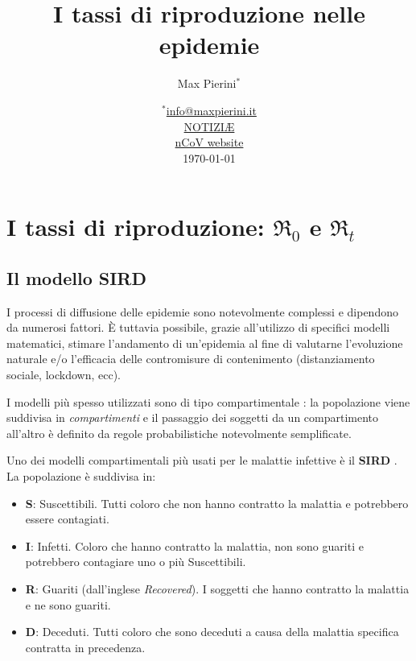 \documentclass[11pt]{article}
\title{I tassi di riproduzione nelle epidemie}
\author{Max Pierini$^*$}
\date{%
    $^*$\href{mailto:info@maxpierini.it}{info@maxpierini.it}\\%
    \href{https://t.me/notiziae}{NOTIZI\AE}\\%
    \href{https://maxpierini.it/ncov}{nCoV website}\\[2ex]%
    \today
}
\begin{document}
    
    \maketitle
    
    

    
    \hypertarget{i-tassi-di-riproduzione-re_0-e-re_t}{%
\section{\texorpdfstring{I tassi di riproduzione: \(\Re_0\) e
\(\Re_t\)}{I tassi di riproduzione: \textbackslash Re\_0 e \textbackslash Re\_t}}\label{i-tassi-di-riproduzione-re_0-e-re_t}}

    \hypertarget{il-modello-sird}{%
\subsection{\texorpdfstring{Il modello
\textbf{SIRD}}{Il modello SIRD}}\label{il-modello-sird}}

    I processi di diffusione delle epidemie sono notevolmente complessi e
dipendono da numerosi fattori. È tuttavia possibile, grazie all'utilizzo
di specifici modelli matematici, stimare l'andamento di un'epidemia al
fine di valutarne l'evoluzione naturale e/o l'efficacia delle
contromisure di contenimento (distanziamento sociale, lockdown, ecc).

I modelli più spesso utilizzati sono di tipo compartimentale
\cite{fassina2013modelli}: la popolazione viene suddivisa in
\emph{compartimenti} e il passaggio dei soggetti da un compartimento
all'altro è definito da regole probabilistiche notevolmente
semplificate.

Uno dei modelli compartimentali più usati per le malattie infettive è il
\textbf{SIRD} \cite{ep_repository_2020}. La popolazione è suddivisa in:

\begin{itemize}
\item
  \textbf{S}: Suscettibili. Tutti coloro che non hanno contratto la
  malattia e potrebbero essere contagiati.
\item
  \textbf{I}: Infetti. Coloro che hanno contratto la malattia, non sono
  guariti e potrebbero contagiare uno o più Suscettibili.
\item
  \textbf{R}: Guariti (dall'inglese \emph{Recovered}). I soggetti che
  hanno contratto la malattia e ne sono guariti.
\item
  \textbf{D}: Deceduti. Tutti coloro che sono deceduti a causa della
  malattia specifica contratta in precedenza.
\end{itemize}
\end{document}

